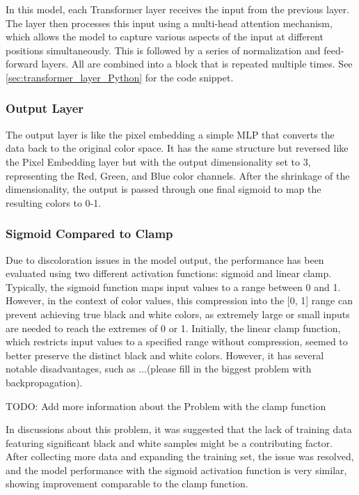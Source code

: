     In this model, each Transformer layer receives the input from the previous layer. The layer then processes this input using a multi-head attention mechanism, which allows the model to capture various aspects of the input at different positions simultaneously. This is followed by a series of normalization and feed-forward layers. All are combined into a block that is repeated multiple times. See \autoref{sec:transformer_layer_Python} for the code snippet.


    \subsubsection{Output Layer}

    The output layer is like the pixel embedding a simple MLP that converts the data back to the original color space. It has the same structure but reversed like the Pixel Embedding layer but with the output dimensionality set to \(3\), representing the Red, Green, and Blue color channels. After the shrinkage of the dimensionality, the output is passed through one final sigmoid to map the resulting colors to 0-1.

    \subsubsection{Sigmoid Compared to Clamp}
    \label{sec:sigmoid_vs_clamp}
    
    Due to discoloration issues in the model output, the performance has been evaluated using two different activation functions: sigmoid and linear clamp. Typically, the sigmoid function maps input values to a range between 0 and 1. However, in the context of color values, this compression into the [0, 1] range can prevent achieving true black and white colors, as extremely large or small inputs are needed to reach the extremes of 0 or 1. Initially, the linear clamp function, which restricts input values to a specified range without compression, seemed to better preserve the distinct black and white colors. However, it has several notable disadvantages, such as ...(please fill in the biggest problem with backpropagation).
    
    TODO: Add more information about the Problem with the clamp function

    In discussions about this problem, it was suggested that the lack of training data featuring significant black and white samples might be a contributing factor. After collecting more data and expanding the training set, the issue was resolved, and the model performance with the sigmoid activation function is very similar, showing improvement comparable to the clamp function.
    

